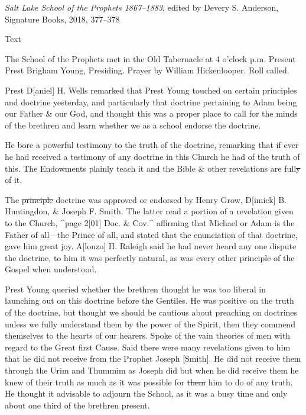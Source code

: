 					\textit{Salt Lake School of the Prophets 1867--1883}, edited by Devery S. Anderson, Signature Books, 2018, 377--378
				
				\begin{description}
					\item[Text]
				\end{description}
				
					The School of the Prophets met in the Old Tabernacle at 4 o'clock p.m. Present Prest Brigham Young, Presiding. Prayer by William Hickenlooper. Roll called. 

					Prest D[aniel] H. Wells remarked that Prest Young touched on certain principles and doctrine yesterday, and particularly that doctrine pertaining to Adam being our Father \& our God, and thought this was a proper place to call for the minds of the brethren and learn whether we as a school endorse the doctrine.
					
					He bore a powerful testimony to the truth of the doctrine, remarking that if ever he had received a testimony of any doctrine in this Church he had of the truth of this. The Endowments plainly teach it and the Bible \& other revelations are full\sout{y} of it.
					
					The \sout{principle} doctrine was approved or endorsed by Henry Grow, D[imick] B. Huntingdon, \& Joseph F. Smith. The latter read a portion of a revelation given to the Church, \^{}page 2[01] Doc. \& Cov.\^{} affirming that Michael or Adam is the Father of all---the Prince of all, and stated that the enunciation of that doctrine, gave him great joy. A[lonzo] H. Raleigh said he had never heard any one dispute the doctrine, to him it was perfectly natural, as was every other principle of the Gospel when understood.
					
					Prest Young queried whether the brethren thought he was too liberal in launching out on this doctrine before the Gentiles. He was positive on the truth of the doctrine, but thought we should be cautious about preaching on doctrines unless we fully understand them by the power of the Spirit, then they commend themselves to the hearts of our hearers. Spoke of the vain theories of men with regard to the Great first Cause. Said there were many revelations given to him that he did not receive from the Prophet Joseph [Smith]. He did not receive them through the Urim and Thummim as Joseph did but when he did receive them he knew of their truth as much as it was possible for \sout{them} him to do of any truth. He thought it advisable to adjourn the School, as it was a busy time and only about one third of the brethren present.
					

